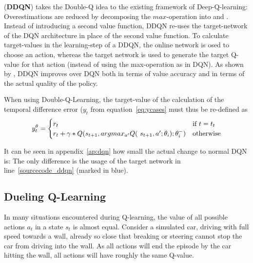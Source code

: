 \noindent {} (\textbf{DDQN}) takes the Double-Q idea to the existing framework of Deep-Q-learning: Overestimations are reduced by decomposing the $max$-operation into  and . Instead of introducing a second value function, DDQN re-uses the target-network of the DQN architecture in place of the second value function. To calculate target-values in the learning-step of a DDQN, the online network is osed to choose an action, whereas the target network is used to generate the target Q-value for that action (instead of using the max-operation as in DQN). As shown by \cite{van_hasselt_deep_2015}, DDQN improves over DQN both in terms of value accuracy and in terms of the actual quality of the policy. 

When using Double-Q-Learning, the target-value of the calculation of the temporal difference error ($y_t$ from equation~\ref{eq:ycases} must thus be re-defined as 
\begin{equation}
		y_t^\theta = \begin{cases} 
	r_t & \text{if } t = t_t\\
	r_t + \gamma * Q(s_{t+1}, argmax_{a'} Q($  $s_{t+1}, a'; \theta_i); \theta_i^-) & \text{otherwise} 
	\end{cases} %
\end{equation}

It can be seen in appendix~\ref{ap:dqn} how small the actual change to normal DQN is: The only difference is the usage of the target network in line~\ref{sourcecode_ddqn} (marked in blue).

\subsection{Dueling Q-Learning}

\label{sec:dueling}

In many situations encountered during Q-learning, the value of all possible actions $a_t$ in a state $s_t$ is almost equal. Consider a simulated car, driving with full speed towards a wall, already so close that breaking or steering cannot stop the car from driving into the wall. As all actions will end the episode by the car hitting the wall, all actions will have roughly the same Q-value. 

